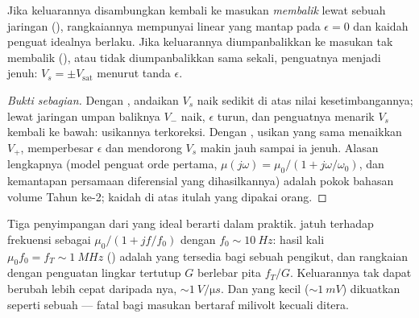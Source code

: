 \begin{proposition}\label{prop:b1:operational-amplifier:feedback}
Jika keluarannya disambungkan kembali ke masukan \emph{membalik} lewat
sebuah jaringan (), rangkaiannya mempunyai  linear yang mantap pada $\epsilon = 0$ dan kaidah penguat idealnya
berlaku. Jika keluarannya diumpanbalikkan ke masukan tak membalik
(), atau tidak diumpanbalikkan sama sekali,
penguatnya menjadi jenuh: $V_s = \pm V_{\mathrm{sat}}$ menurut tanda
$\epsilon$.
\end{proposition}

\begin{proof}[Bukti sebagian]
Dengan , andaikan $V_s$ naik sedikit di atas nilai
kesetimbangannya; lewat jaringan umpan baliknya $V_-$ naik, $\epsilon$
turun, dan penguatnya menarik $V_s$ kembali ke bawah: usikannya
terkoreksi. Dengan , usikan yang sama menaikkan
$V_+$, memperbesar $\epsilon$ dan mendorong $V_s$ makin jauh sampai ia
jenuh. Alasan lengkapnya (model penguat orde pertama, $\mu(j\omega)
= \mu_0/(1 + j\omega/\omega_0)$, dan kemantapan persamaan diferensial
yang dihasilkannya) adalah pokok bahasan volume Tahun ke-2; kaidah di
atas itulah yang dipakai orang.
\end{proof}

\begin{remark}\label{rem:b1:operational-amplifier:real}
Tiga penyimpangan dari yang ideal berarti dalam praktik.  jatuh terhadap frekuensi sebagai $\mu_0/(1 + jf/f_0)$
dengan $f_0 \sim \qty{10}{Hz}$: hasil kali $\mu_0 f_0 = f_T \sim \qty{1}{MHz}$
(\emph{}) adalah  yang
tersedia bagi sebuah pengikut, dan rangkaian dengan penguatan lingkar
tertutup $G$ berlebar pita $f_T/G$. Keluarannya tak dapat berubah lebih
cepat daripada \emph{}nya, $\sim\qty{1}{V/\micro s}$. Dan
\emph{} yang kecil ($\sim\qty{1}{mV}$)
dikuatkan seperti sebuah  --- fatal bagi masukan bertaraf
milivolt kecuali ditera.
\end{remark}

